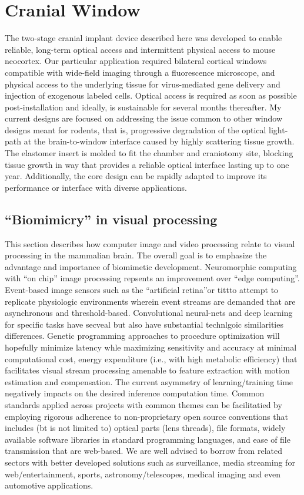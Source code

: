 \documentclass[../main.tex]{subfiles}
\begin{document}
\section{Cranial Window}
\label{sec:cranial-window}

The two-stage cranial implant device described here was developed to enable reliable, long-term optical access and intermittent physical access to mouse neocortex.
Our particular application required bilateral cortical windows compatible with wide-field imaging through a fluorescence microscope, and physical access to the underlying tissue for virus-mediated gene delivery and injection of exogenous labeled cells.
Optical access is required as soon as possible post-installation and ideally, is sustainable for several months thereafter.
My current designs are focused on addressing the issue common to other window designs meant for rodents, that is, progressive degradation of the optical light-path at the brain-to-window interface caused by highly scattering tissue growth.
The elastomer insert is molded to fit the chamber and craniotomy site, blocking tissue growth in way that provides a reliable optical interface lasting up to one year.
Additionally, the core design can be rapidly adapted to improve its performance or interface with diverse applications.

\subsection{“Biomimicry” in visual processing}
This section describes how computer image and video processing relate to visual processing in the mammalian brain.
The overall goal is to emphasize the advantage and importance of biomimetic development.
Neuromorphic computing with “on chip” image processing repsents an improvement over “edge computing”.
Event-based image sensors such as the “artificial retina”or tittto attempt to replicate physiologic environments  wherein event streams are demanded that are asynchronous and threshold-based.
Convolutional neural-nets and deep learning for specific tasks have secveal but also have substantial technlgoic similarities differences.
Genetic programming approaches to procedure optimization will hopefully minimize latency whle maximizing sensitivity and accuracy at minimal  computational cost, energy expenditure (i.e., with high metabolic efficiency) that facilitates visual stream processing amenable to feature extraction with motion estimation and compensation.
The current asymmetry of learning/training time negatively impacts on the  desired inference computation time.
Common standards applied across projects with common themes can be facilitatied by employing rigorous adherence to non-proprietary open source conventions that includes (bt is not limited to) optical parts (lens threads), file formats, widely available software libraries in standard programming languages, and ease of file transmission that are web-based.
We are well advised to borrow from related sectors with better developed solutions such as surveillance, media streaming for web/entertainment, sports, astronomy/telescopes, medical imaging and even automotive applications.
\end{document}
